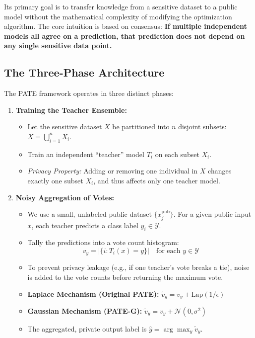 \documentclass[11pt, a4paper]{article}
\begin{document}
Its primary goal is to transfer knowledge from a sensitive dataset to a public model without the mathematical complexity of modifying the optimization algorithm. The core intuition is based on consensus: \textbf{If multiple independent models all agree on a prediction, that prediction does not depend on any single sensitive data point.}

\subsection{The Three-Phase Architecture}

The PATE framework operates in three distinct phases:

\begin{enumerate}
    \item \textbf{Training the Teacher Ensemble:}
    \begin{itemize}
        \item Let the sensitive dataset $X$ be partitioned into $n$ disjoint subsets: $X = \bigcup_{i=1}^n X_i$.
        \item Train an independent ``teacher'' model $T_i$ on each subset $X_i$. 
        \item \textit{Privacy Property:} Adding or removing one individual in $X$ changes exactly one subset $X_i$, and thus affects only one teacher model.
    \end{itemize}

    \item \textbf{Noisy Aggregation of Votes:}
    \begin{itemize}
        \item We use a small, unlabeled public dataset $\{x_j^{\text{pub}}\}$. For a given public input $x$, each teacher predicts a class label $y_i \in \mathcal{Y}$.
        \item Tally the predictions into a vote count histogram:
        \[
        v_y = |\{i : T_i(x) = y\}| \quad \text{for each } y \in \mathcal{Y}
        \]
        \item To prevent privacy leakage (e.g., if one teacher's vote breaks a tie), noise is added to the vote counts before returning the maximum vote.
        \item \textbf{Laplace Mechanism (Original PATE):} $\tilde{v}_y = v_y + \text{Lap}(1/\epsilon)$
        \item \textbf{Gaussian Mechanism (PATE-G):} $\tilde{v}_y = v_y + \mathcal{N}(0, \sigma^2)$
        \item The aggregated, private output label is $\hat{y} = \arg\max_y \tilde{v}_y$.
    \end{itemize}


\end{enumerate}
\end{document}
